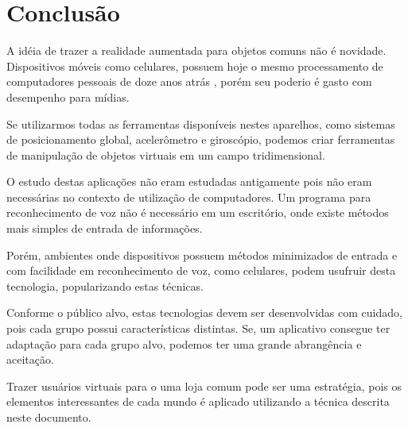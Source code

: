 \documentclass{article}
\begin{document}
\begin{footnotesize}
    
\end{footnotesize}

\begin{footnotesize}
    
\end{footnotesize}

\begin{footnotesize}
    
\end{footnotesize}

\begin{footnotesize}
    
\end{footnotesize}

\section{Conclusão}
\label{sec:conclusao}

A idéia de trazer a realidade aumentada para objetos comuns não é novidade.
Dispositivos móveis como celulares, possuem hoje o mesmo processamento de
computadores pessoais de doze anos atrás \cite{canny2006}, porém seu poderio é
gasto com desempenho para mídias.

Se utilizarmos todas as ferramentas disponíveis nestes aparelhos, como sistemas
de posicionamento global, acelerômetro e giroscópio, podemos criar ferramentas
de manipulação de objetos virtuais em um campo tridimensional.

O estudo destas aplicações não eram estudadas antigamente pois não eram
necessárias no contexto de utilização de computadores. Um programa para
reconhecimento de voz não é necessário em um escritório, onde existe métodos
mais simples de entrada de informações.

Porém, ambientes onde dispositivos possuem métodos minimizados de entrada e com
facilidade em reconhecimento de voz, como celulares, podem usufruir desta
tecnologia, popularizando estas técnicas.

Conforme o público alvo, estas tecnologias devem ser desenvolvidas com cuidado,
pois cada grupo possui características distintas. Se, um aplicativo consegue ter
adaptação para cada grupo alvo, podemos ter uma grande abrangência e aceitação.

Trazer usuários virtuais para o uma loja comum pode ser uma estratégia, pois os
elementos interessantes de cada mundo é aplicado utilizando a técnica descrita
neste documento.



\end{document}
